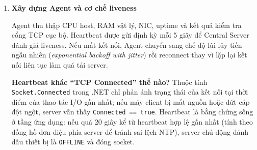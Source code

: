 \begin{enumerate}
    \begin{examplebox}
    Giả sử cần gửi chuỗi JSON dài 120 byte. Bên gửi truyền tổng cộng 124 byte trên wire dạng \texttt{[00 00 00 78] [120 byte JSON UTF-8]} (với \texttt{0x00000078 = 120}). Phía nhận trước hết đọc đủ 4 byte để biết message dài bao nhiêu, kiểm tra giới hạn an toàn, rồi tiếp tục đọc cho tới khi đủ 120 byte. Nếu hệ điều hành trả về 30 byte ở lần đọc đầu và 90 byte ở lần sau (hiện tượng \textit{partial read}), bộ giải mã \texttt{FrameCodec} vẫn gom đủ đúng 120 byte trước khi chuyển sang tầng phân tích JSON. Về lý thuyết, JSON hợp lệ (RFC 8259 \cite{rfc8259}) bắt buộc escape ký tự xuống dòng thành \texttt{\textbackslash n} nên giao thức phân tách bằng newline trên JSON đơn dòng vẫn có thể dùng được; tuy nhiên LabGuard chọn length-prefix vì nó cung cấp contract nhị phân tường minh, biết trước kích thước để cấp phát bộ đệm một lần và kiểm soát parser chặt chẽ.
    \end{examplebox}

    Kích thước frame được giới hạn ở mức thiết kế $N \leq 256$ KiB để ngăn ngừa tấn công làm tràn bộ nhớ RAM (OutOfMemory DoS). Envelope chuẩn hóa gồm \texttt{version}, \texttt{messageType}, \texttt{requestId}, \texttt{deviceId}, \texttt{sentAtUtc} và \texttt{payload} (trong đó cờ \texttt{isReplay} được đặt bên trong payload của telemetry và service status).

    \item \textbf{Xây dựng Agent và cơ chế liveness}

    Agent thu thập CPU host, RAM vật lý, NIC, uptime và kết quả kiểm tra cổng TCP cục bộ. Heartbeat được gửi định kỳ mỗi 5 giây để Central Server đánh giá liveness. Nếu mất kết nối, Agent chuyển sang chế độ lùi lũy tiến ngẫu nhiên (\textit{exponential backoff with jitter}) rồi reconnect thay vì lặp lại kết nối liên tục làm quá tải server.

    \begin{beginnerbox}
    \textbf{Heartbeat khác ``TCP Connected'' thế nào?} Thuộc tính \texttt{Socket.Connected} trong .NET \cite{mslearn_sockets} chỉ phản ánh trạng thái của kết nối tại thời điểm của thao tác I/O gần nhất; nếu máy client bị mất nguồn hoặc đứt cáp đột ngột, server vẫn thấy \texttt{Connected == true}. Heartbeat là bằng chứng sống ở tầng ứng dụng: nếu quá 20 giây kể từ heartbeat hợp lệ gần nhất (tính theo đồng hồ đơn điệu phía server để tránh sai lệch NTP), server chủ động đánh dấu thiết bị là \texttt{OFFLINE} và đóng socket.
    \end{beginnerbox}


\end{enumerate}
